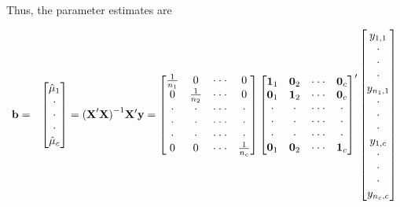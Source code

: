 Thus, the parameter estimates are

\begin{center}
\begin{eqnarray}\label{E4:OneFactorXPrimeXinvXPrimey}
\mathbf{b} &=&%
\begin{bmatrix}
\hat{\mu}_{1} \\
\cdot  \\
\cdot  \\
\cdot  \\
\hat{\mu}_{c}%
\end{bmatrix}%
=\mathbf{(X}^{\prime }\mathbf{X)}^{-1}\mathbf{X}^{\prime }\mathbf{y}=%
\begin{bmatrix}
\frac{1}{n_1} & 0 & \cdot \cdot \cdot  & 0 \\
0 & \frac{1}{n_2} & \cdot \cdot \cdot  & 0 \\
\cdot  & \cdot  & \cdot \cdot \cdot  & \cdot  \\
\cdot  & \cdot  & \cdot \cdot \cdot  & \cdot  \\
\cdot  & \cdot  & \cdot \cdot \cdot  & \cdot  \\
0 & 0 & \cdot \cdot \cdot  & \frac{1}{n_c}
\end{bmatrix}
\begin{bmatrix}
\mathbf{1}_1 & \mathbf{0}_2 & \cdot \cdot \cdot  & \mathbf{0}_c \\
\mathbf{0}_1 & \mathbf{1}_2 & \cdot \cdot \cdot  & \mathbf{0}_c \\
\cdot  & \cdot  & \cdot \cdot \cdot  & \cdot  \\
\cdot  & \cdot  & \cdot \cdot \cdot  & \cdot  \\
\cdot  & \cdot  & \cdot \cdot \cdot  & \cdot  \\
\mathbf{0}_{1} & \mathbf{0}_{2} & \cdot \cdot \cdot  & \mathbf{1}_c%
\end{bmatrix} ^{\prime }
\begin{bmatrix}
y_{1,1} \\
\cdot  \\
\cdot  \\
\cdot  \\
y_{n_{1},1} \\
\cdot  \\
\cdot  \\
\cdot  \\
y_{1,c} \\
\cdot  \\
\cdot  \\
\cdot  \\
y_{n_{c},c}%
\end{bmatrix} \notag

\end{eqnarray}
\end{center}
